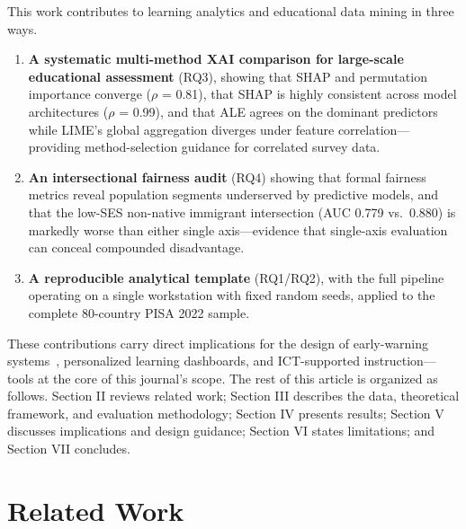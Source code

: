 \documentclass[journal]{IEEEtran}
\begin{document}
This work contributes to learning analytics and educational data mining in three ways.
\begin{enumerate}
\item \textbf{A systematic multi-method XAI comparison for large-scale educational assessment} (RQ3), showing that SHAP and permutation importance converge ($\rho$ = 0.81), that SHAP is highly consistent across model architectures ($\rho$ = 0.99), and that ALE agrees on the dominant predictors while LIME's global aggregation diverges under feature correlation---providing method-selection guidance for correlated survey data.
\item \textbf{An intersectional fairness audit} (RQ4) showing that formal fairness metrics reveal population segments underserved by predictive models, and that the low-SES non-native immigrant intersection (AUC 0.779 vs.\ 0.880) is markedly worse than either single axis---evidence that single-axis evaluation can conceal compounded disadvantage.
\item \textbf{A reproducible analytical template} (RQ1/RQ2), with the full pipeline operating on a single workstation with fixed random seeds, applied to the complete 80-country PISA 2022 sample.
\end{enumerate}
These contributions carry direct implications for the design of early-warning systems~\cite{baneres2023dropout}, personalized learning dashboards, and ICT-supported instruction---tools at the core of this journal's scope. The rest of this article is organized as follows. Section II reviews related work; Section III describes the data, theoretical framework, and evaluation methodology; Section IV presents results; Section V discusses implications and design guidance; Section VI states limitations; and Section VII concludes.

\section{Related Work}
\end{document}
